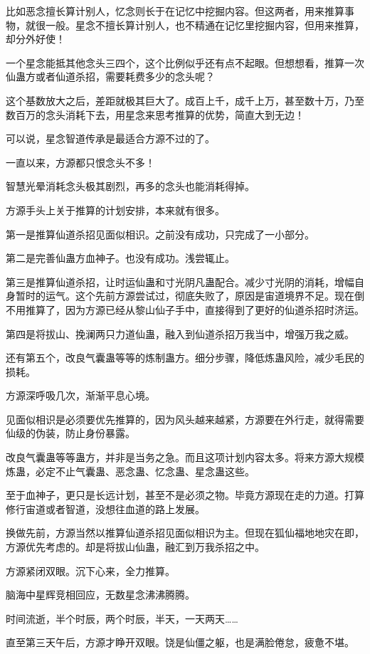 \begin{this_body}
比如恶念擅长算计别人，忆念则长于在记忆中挖掘内容。但这两者，用来推算事物，就很一般。星念不擅长算计别人，也不精通在记忆里挖掘内容，但用来推算，却分外好使！

一个星念能抵其他念头三四个，这个比例似乎还有点不起眼。但想想看，推算一次仙蛊方或者仙道杀招，需要耗费多少的念头呢？

这个基数放大之后，差距就极其巨大了。成百上千，成千上万，甚至数十万，乃至数百万的念头消耗下去，用星念来思考推算的优势，简直大到无边！

可以说，星念智道传承是最适合方源不过的了。

一直以来，方源都只恨念头不多！

智慧光晕消耗念头极其剧烈，再多的念头也能消耗得掉。

方源手头上关于推算的计划安排，本来就有很多。

第一是推算仙道杀招见面似相识。之前没有成功，只完成了一小部分。

第二是完善仙蛊方血神子。也没有成功。浅尝辄止。

第三是推算仙道杀招，让时运仙蛊和寸光阴凡蛊配合。减少寸光阴的消耗，增幅自身暂时的运气。这个先前方源尝试过，彻底失败了，原因是宙道境界不足。现在倒不用推算了，因为方源已经从黎山仙子手中，直接得到了更好的仙道杀招时济运。

第四是将拔山、挽澜两只力道仙蛊，融入到仙道杀招万我当中，增强万我之威。

还有第五个，改良气囊蛊等等的炼制蛊方。细分步骤，降低炼蛊风险，减少毛民的损耗。

方源深呼吸几次，渐渐平息心境。

见面似相识是必须要优先推算的，因为风头越来越紧，方源要在外行走，就得需要仙级的伪装，防止身份暴露。

改良气囊蛊等等蛊方，并非是当务之急。而且这项计划内容太多。将来方源大规模炼蛊，必定不止气囊蛊、恶念蛊、忆念蛊、星念蛊这些。

至于血神子，更只是长远计划，甚至不是必须之物。毕竟方源现在走的力道。打算修行宙道或者智道，没想往血道的路上发展。

换做先前，方源当然以推算仙道杀招见面似相识为主。但现在狐仙福地地灾在即，方源优先考虑的。却是将拔山仙蛊，融汇到万我杀招之中。

方源紧闭双眼。沉下心来，全力推算。

脑海中星辉竞相回应，无数星念沸沸腾腾。

时间流逝，半个时辰，两个时辰，半天，一天两天……

直至第三天午后，方源才睁开双眼。饶是仙僵之躯，也是满脸倦怠，疲惫不堪。


\end{this_body}
